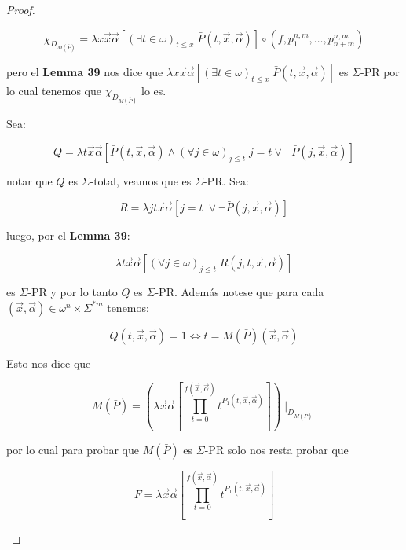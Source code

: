 \begin{proof}
\begin{enumerate}[a)]
        \[
          \chi_{D_{M(\bar{P})}} = \lambda x\vec{x}\vec{\alpha} \left[(\exists t \in \omega)_{t\leq x} \;
          \bar{P}(t,\vec{x},\vec{\alpha})\right] \circ (f,p_{1}^{n,m},\dotsc,p_{n+m}^{n,m})
        \]

        \par pero el \textbf{Lemma 39} nos dice que $\lambda x\vec{x}\vec{\alpha} \left[(\exists t \in \omega)_{t\leq x}
        \; \bar{P}(t,\vec{x},\vec{\alpha})\right]$ es $\Sigma$-PR por lo cual tenemos que $\chi_{D_{M(\bar{P})}}$ lo es.

        \par Sea:

        \[
          Q = \lambda t\vec{x}\vec{\alpha}\left[\bar{P}(t,\vec{x},\vec{\alpha}) \wedge (\forall j \in \omega)_{j \leq t}
          \; j=t \vee \lnot \bar{P}(j,\vec{x},\vec{\alpha})\right]
        \]

        \par notar que $Q$ es $\Sigma$-total, veamos que es $\Sigma$-PR. Sea:

        \[
          R = \lambda jt\vec{x}\vec{\alpha} \left[j=t \; \vee \neg \bar{P}(j,\vec{x},\vec{\alpha})\right]
        \]

        \par luego, por el \textbf{Lemma 39}:

        \[
          \lambda t\vec{x}\vec{\alpha} \left[(\forall j \in \omega)_{j \leq t} \; R(j,t,\vec{x},\vec{\alpha})\right]
        \]

        \par es $\Sigma$-PR y por lo tanto $Q$ es $\Sigma$-PR. Además notese que para cada $(\vec{x},\vec{\alpha}) \in
        \omega^{n} \times \Sigma^{\ast m}$ tenemos:

        \[
          Q(t,\vec{x},\vec{\alpha}) = 1 \Leftrightarrow t = M(\bar{P})(\vec{x},\vec{\alpha})
        \]

        \par Esto nos dice que

        \[
          M(\bar{P}) = \left(\lambda \vec{x}\vec{\alpha}\left[\prod_{t=0}^{f(\vec{x},\vec{\alpha})}t^{P_{1}(t,\vec{x},
          \vec{\alpha})}\right]\right) \mid_{D_{M(\bar{P})}}
        \]

        \par por lo cual para probar que $M(\bar{P})$ es $\Sigma$-PR solo nos resta probar que

        \[
          F = \lambda \vec{x}\vec{\alpha}\left[\prod_{t=0}^{f(\vec{x},\vec{\alpha})}t^{P_{1}(t,\vec{x},\vec{\alpha})}
          \right]
        \]


\end{enumerate}
\end{proof}
